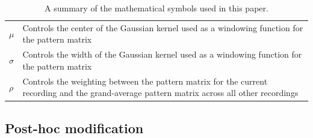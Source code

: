 \documentclass[a4paper]{vanvliet_paper}
\begin{document}
\begin{table}
\begin{tabular}{lp{12cm}}
        $\mu$ & Controls the center of the Gaussian kernel used as a windowing function for the pattern matrix \\
        $\sigma$ & Controls the width of the Gaussian kernel used as a windowing function for the pattern matrix \\
        $\rho$ & Controls the weighting between the pattern matrix for the current recording and the grand-average pattern matrix across all other recordings \\
        \bottomrule
    \end{tabular}
    \caption{A summary of the mathematical symbols used in this paper.}\label{tab:notation}
\end{table}


\subsection{Post-hoc modification}\label{sec:posthoc}
\end{document}
